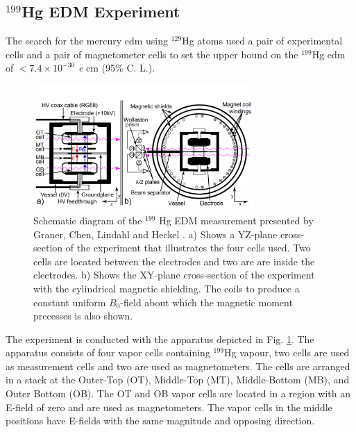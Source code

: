 \subsection{$^{199}$Hg EDM Experiment}

The search for the mercury \gls{edm} using $^{129}$Hg atoms used a pair of experimental cells and a pair of magnetometer cells to set the upper bound on the $^{199}$Hg \gls{edm} of $< 7.4 \times 10^{-30}$ \textit{e} cm (95\% C. L.)\cite{Graner2016, Graner2017}.

\begin{figure} [htbp]
	\center
		\includegraphics[width=0.75\textwidth]{199HgExperiment.png}
	\caption{ Schematic diagram of the $^{199}$ Hg EDM measurement presented by Graner, Chen, Lindahl and Heckel \cite{Graner2016}. a) Shows a YZ-plane cross-section of the experiment that illustrates the four cells used.  Two cells are located between the electrodes and two are are inside the electrodes. b) Shows the XY-plane cross-section of the experiment with the cylindrical magnetic shielding. The coils to produce a constant uniform $B_0$-field about which the magnetic moment precesses is also shown.}
		\label{fig:HgApp}
\end{figure}

The experiment is conducted with the apparatus depicted in Fig. \ref{fig:HgApp}. The apparatus  consists of four vapor cells containing $^{199}$Hg vapour, two cells are used as measurement cells and two are used as magnetometers. The cells are arranged in a stack at the Outer-Top (OT), Middle-Top (MT), Middle-Bottom (MB), and Outer Bottom (OB). The OT and OB vapor cells are located in a region with an E-field of zero and are used as magnetometers. The vapor cells in the middle positions have  E-fields with the same magnitude and opposing direction. 

